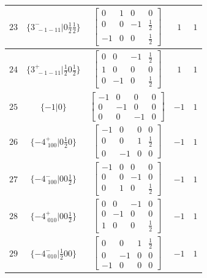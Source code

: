 \documentclass[fleqn,8pt]{jsarticle}
\begin{document}
\begin{longtable}{ccccc}
$ 23 $ & $ \{3^{-}_{\,\,-1-11}|0 \frac{1}{2} \frac{1}{2}\} $ & $ \begin{bmatrix} 0 & 1 & 0 & 0 \\ 0 & 0 & -1 & \frac{1}{2} \\ -1 & 0 & 0 & \frac{1}{2} \end{bmatrix} $ & $ 1 $ & $ 1 $ \\ \hline
$ 24 $ & $ \{3^{+}_{\,\,-1-11}|\frac{1}{2} 0 \frac{1}{2}\} $ & $ \begin{bmatrix} 0 & 0 & -1 & \frac{1}{2} \\ 1 & 0 & 0 & 0 \\ 0 & -1 & 0 & \frac{1}{2} \end{bmatrix} $ & $ 1 $ & $ 1 $ \\ \hline
$ 25 $ & $ \{-1|0\} $ & $ \begin{bmatrix} -1 & 0 & 0 & 0 \\ 0 & -1 & 0 & 0 \\ 0 & 0 & -1 & 0 \end{bmatrix} $ & $ -1 $ & $ 1 $ \\ \hline
$ 26 $ & $ \{-4^{+}_{\,\,100}|0 \frac{1}{2} 0\} $ & $ \begin{bmatrix} -1 & 0 & 0 & 0 \\ 0 & 0 & 1 & \frac{1}{2} \\ 0 & -1 & 0 & 0 \end{bmatrix} $ & $ -1 $ & $ 1 $ \\ \hline
$ 27 $ & $ \{-4^{-}_{\,\,100}|0 0 \frac{1}{2}\} $ & $ \begin{bmatrix} -1 & 0 & 0 & 0 \\ 0 & 0 & -1 & 0 \\ 0 & 1 & 0 & \frac{1}{2} \end{bmatrix} $ & $ -1 $ & $ 1 $ \\ \hline
$ 28 $ & $ \{-4^{+}_{\,\,010}|0 0 \frac{1}{2}\} $ & $ \begin{bmatrix} 0 & 0 & -1 & 0 \\ 0 & -1 & 0 & 0 \\ 1 & 0 & 0 & \frac{1}{2} \end{bmatrix} $ & $ -1 $ & $ 1 $ \\ \hline
$ 29 $ & $ \{-4^{-}_{\,\,010}|\frac{1}{2} 0 0\} $ & $ \begin{bmatrix} 0 & 0 & 1 & \frac{1}{2} \\ 0 & -1 & 0 & 0 \\ -1 & 0 & 0 & 0 \end{bmatrix} $ & $ -1 $ & $ 1 $ \\ \hline

\end{longtable}
\end{document}
